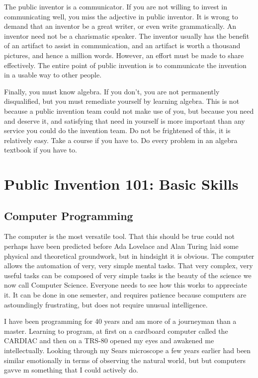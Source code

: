 \documentclass[
	fontsize=10pt, %
	twoside=false, %
	secnumdepth=1, %
]{kaobook}
\begin{document}
The public inventor is a communicator.
If you are not willing to invest in communicating well,
you miss the adjective in public inventor.
It is wrong to demand that an inventor be a great writer,
or even write grammatically.
An inventor need not be a charismatic speaker.
The inventor usually has the benefit of an artifact to assist
in communication, and an artifact is worth a thousand pictures,
and hence a million words.
However, an effort must be made to share effectively.
The entire point of public invention is to communicate the invention
in a usable way to other people.

Finally, you must know algebra.
If you don't, you are not permanently disqualified,
but you must remediate yourself by learning algebra.
This is not because a public invention team could not make
use of you, but because you need and deserve it, and
satisfying that need in yourself is more important than
any service you could do the invention team.
Do not be frightened of this, it is relatively easy.
Take a course if you have to.
Do every problem in an algebra textbook if you have to.\cite{Moses2001}

\chapter{Public Invention 101: Basic Skills}

\section{Computer Programming}

The computer is the most versatile tool.
That this should be true could not perhaps have been predicted
before Ada Lovelace and Alan Turing laid some physical and
theoretical groundwork,
but in hindsight it is obvious.
The computer allows the automation of very, very simple
mental tasks.
That very complex, very useful tasks can be composed of very simple tasks
is the beauty of the science we now call Computer Science.
Everyone needs to see how this works to appreciate it.
It can be done in one semester, and requires patience
because computers are astoundingly frustrating, but
does not require unusual intelligence.

I have been programming for 40 years and am more
of a journeyman than a master.
Learning to program, at first on a cardboard computer
called the CARDIAC and then on a TRS-80
opened my eyes and awakened me intellectually.
Looking through my Sears microscope a few years earlier
had been similar emotionally in terms of observing
the natural world, but but computers gavve m something that
I could actively do.
\end{document}
